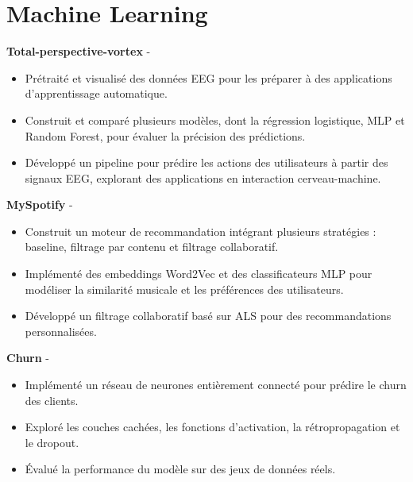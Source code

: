\documentclass[a4paper,11pt]{article}%
\begin{document}
\section*{Machine Learning}%
%
\noindent \textbf{Total-perspective-vortex} - \href{https://github.com/sboof911/total-perspectivevortex}{{}}%
\begin{itemize}[leftmargin=2em,label={},parsep=0pt,topsep=1em]%
\item Pr\'etrait\'e et visualis\'e des donn\'ees EEG pour les pr\'eparer \`a des applications d'apprentissage automatique.%
\item Construit et compar\'e plusieurs mod\`eles, dont la r\'egression logistique, MLP et Random Forest, pour \'evaluer la pr\'ecision des pr\'edictions.%
\item D\'evelopp\'e un pipeline pour pr\'edire les actions des utilisateurs \`a partir des signaux EEG, explorant des applications en interaction cerveau-machine.%
\end{itemize}%
%
\noindent \textbf{MySpotify} - \href{https://github.com/sboof911/MySpotify}{{}}%
\begin{itemize}[leftmargin=2em,label={},parsep=0pt,topsep=1em]%
\item Construit un moteur de recommandation int\'egrant plusieurs strat\'egies : baseline, filtrage par contenu et filtrage collaboratif.%
\item Impl\'ement\'e des embeddings Word2Vec et des classificateurs MLP pour mod\'eliser la similarit\'e musicale et les pr\'ef\'erences des utilisateurs.%
\item D\'evelopp\'e un filtrage collaboratif bas\'e sur ALS pour des recommandations personnalis\'ees.%
\end{itemize}%
%
\noindent \textbf{Churn} - \href{https://github.com/sboof911/churn}{{}}%
\begin{itemize}[leftmargin=2em,label={},parsep=0pt,topsep=1em]%
\item Impl\'ement\'e un r\'eseau de neurones enti\`erement connect\'e pour pr\'edire le churn des clients.%
\item Explor\'e les couches cach\'ees, les fonctions d'activation, la r\'etropropagation et le dropout.%
\item \'Evalu\'e la performance du mod\`ele sur des jeux de donn\'ees r\'eels.%
\end{itemize}%
\end{document}
